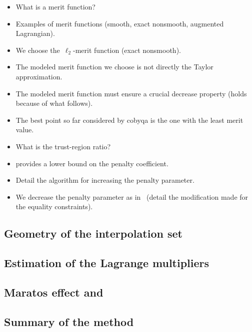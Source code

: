 \begin{itemize}
    \item What is a merit function?
    \item Examples of merit functions (smooth, exact nonsmooth, augmented Lagrangian).
    \item We choose the~$\ell_2$-merit function (exact nonsmooth).
    \item The modeled merit function we choose is not directly the Taylor approximation.
    \item The modeled merit function must ensure a crucial decrease property (holds because of what follows).
    \item The best point so far considered by \gls{cobyqa} is the one with the least merit value.
    \item What is the trust-region ratio?
    \item \Cite[Thm.~14.5.1]{Conn_Gould_Toint_2000} provides a lower bound on the penalty coefficient.
    \item Detail the algorithm for increasing the penalty parameter.
    \item We decrease the penalty parameter as in~\cite{Powell_1994} (detail the modification made for the equality constraints).
\end{itemize}

\subsection{Geometry of the interpolation set}

\subsection{Estimation of the Lagrange multipliers}

\subsection{Maratos effect and }

\subsection{Summary of the method}
